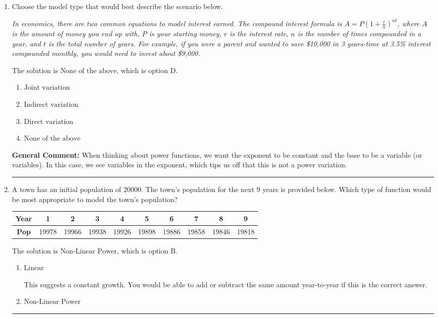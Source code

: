 \documentclass{extbook}[14pt]
\newcommand{\litem}[1]{\item #1

\rule{\textwidth}{0.4pt}}
\begin{document}
\begin{enumerate}\litem{
Choose the model type that would best describe the scenario below.

\begin{center}
    \textit{ In economics, there are two common equations to model interest earned. The compound interest formula is $A = P (1 + \frac{r}{n})^{nt}$, where $A$ is the amount of money you end up with, $P$ is your starting money, $r$ is the interest rate, $n$ is the number of times compounded in a year, and $t$ is the total number of years. For example, if you were a parent and wanted to save \$10,000 in 3 years-time at 3.5\% interest compounded monthly, you would need to invest about \$9,000. }
\end{center}
The solution is \( \text{None of the above} \), which is option D.\begin{enumerate}[label=\Alph*.]
\item \( \text{Joint variation} \)


\item \( \text{Indirect variation} \)


\item \( \text{Direct variation} \)


\item \( \text{None of the above} \)


\end{enumerate}

\textbf{General Comment:} When thinking about power functions, we want the exponent to be constant and the base to be a variable (or variables). In this case, we see variables in the exponent, which tips us off that this is not a power variation.
}
\litem{
A town has an initial population of 20000. The town's population for the next 9 years is provided below. Which type of function would be most appropriate to model the town's population?


\begin{tabular}{c|c|c|c|c|c|c|c|c|c}
\textbf{Year} &1 &2 &3 &4 &5 &6 &7 &8 &9\tabularnewline \hline
\textbf{Pop} &19978 &19966 &19938 &19926 &19898 &19886 &19858 &19846 &19818\end{tabular}The solution is \( \text{Non-Linear Power} \), which is option B.\begin{enumerate}[label=\Alph*.]
\item \( \text{Linear} \)

This suggests a constant growth. You would be able to add or subtract the same amount year-to-year if this is the correct answer.
\item \( \text{Non-Linear Power} \)


\end{enumerate}}
\end{enumerate}
\end{document}
